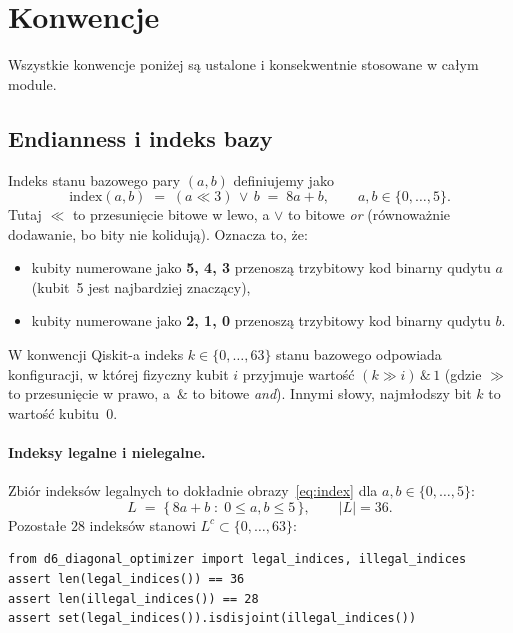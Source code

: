 \documentclass[11pt,a4paper]{article}
\newcommand{\1}{\mathbf{1}}
\begin{document}
\section{Konwencje}
\label{sec:conventions}

Wszystkie konwencje poniżej są ustalone i konsekwentnie stosowane w
całym module.

\subsection{Endianness i indeks bazy}
\label{sec:endianness}

Indeks stanu bazowego pary $(a,b)$ definiujemy jako
\begin{equation}
\label{eq:index}
\mathrm{index}(a,b) \;=\; (a \ll 3) \,\lor\, b \;=\; 8a+b,
\qquad a,b\in\{0,\dots,5\}.
\end{equation}
Tutaj $\ll$ to przesunięcie bitowe w lewo, a $\lor$ to bitowe \emph{or}
(równoważnie dodawanie, bo bity nie kolidują). Oznacza to, że:
\begin{itemize}[leftmargin=*]
  \item kubity numerowane jako \textbf{5, 4, 3} przenoszą trzybitowy
        kod binarny qudytu $a$ (kubit~5 jest najbardziej znaczący),
  \item kubity numerowane jako \textbf{2, 1, 0} przenoszą trzybitowy
        kod binarny qudytu $b$.
\end{itemize}
W konwencji Qiskit-a indeks $k\in\{0,\dots,63\}$ stanu bazowego
odpowiada konfiguracji, w której fizyczny kubit $i$ przyjmuje wartość
$(k \gg i)\,\&\,1$ (gdzie $\gg$ to przesunięcie w prawo, a~$\&$ to bitowe
\emph{and}). Innymi słowy, najmłodszy bit $k$ to wartość kubitu~0.

\paragraph{Indeksy legalne i nielegalne.} Zbiór indeksów legalnych to
dokładnie obrazy~\eqref{eq:index} dla $a,b\in\{0,\dots,5\}$:
\begin{equation}
\label{eq:legal}
L \;=\; \bigl\{\,8a+b\;:\;0\le a,b\le 5\,\bigr\},\qquad |L|=36.
\end{equation}
Pozostałe $28$ indeksów stanowi $L^{c}\subset\{0,\dots,63\}$:
\begin{lstlisting}
from d6_diagonal_optimizer import legal_indices, illegal_indices
assert len(legal_indices()) == 36
assert len(illegal_indices()) == 28
assert set(legal_indices()).isdisjoint(illegal_indices())
\end{lstlisting}
\end{document}

